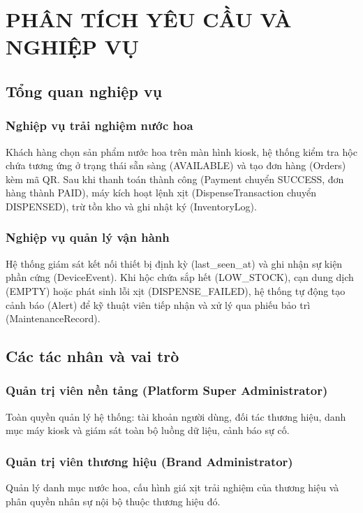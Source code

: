 \chapter{PHÂN TÍCH YÊU CẦU VÀ NGHIỆP VỤ}
{\selectfont

\section{Tổng quan nghiệp vụ}

\subsection{Nghiệp vụ trải nghiệm nước hoa}
Khách hàng chọn sản phẩm nước hoa trên màn hình kiosk, hệ thống kiểm tra hộc chứa tương ứng ở trạng thái sẵn sàng (AVAILABLE) và tạo đơn hàng (Orders) kèm mã QR. Sau khi thanh toán thành công (Payment chuyển SUCCESS, đơn hàng thành PAID), máy kích hoạt lệnh xịt (DispenseTransaction chuyển DISPENSED), trừ tồn kho và ghi nhật ký (InventoryLog).

\subsection{Nghiệp vụ quản lý vận hành}
Hệ thống giám sát kết nối thiết bị định kỳ (last\_seen\_at) và ghi nhận sự kiện phần cứng (DeviceEvent). Khi hộc chứa sắp hết (LOW\_STOCK), cạn dung dịch (EMPTY) hoặc phát sinh lỗi xịt (DISPENSE\_FAILED), hệ thống tự động tạo cảnh báo (Alert) để kỹ thuật viên tiếp nhận và xử lý qua phiếu bảo trì (MaintenanceRecord).

\section{Các tác nhân và vai trò}

\subsection{Quản trị viên nền tảng (Platform Super Administrator)}
Toàn quyền quản lý hệ thống: tài khoản người dùng, đối tác thương hiệu, danh mục máy kiosk và giám sát toàn bộ luồng dữ liệu, cảnh báo sự cố.

\subsection{Quản trị viên thương hiệu (Brand Administrator)}
Quản lý danh mục nước hoa, cấu hình giá xịt trải nghiệm của thương hiệu và phân quyền nhân sự nội bộ thuộc thương hiệu đó.

}
